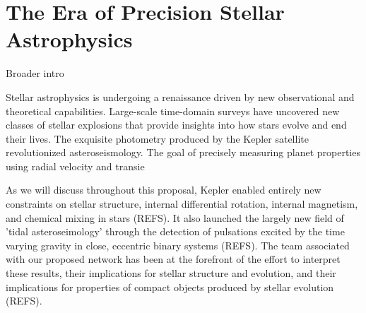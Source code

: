 \section{The Era of Precision Stellar Astrophysics}
Broader intro

Stellar astrophysics is undergoing a renaissance driven by new observational and theoretical capabilities.   Large-scale time-domain surveys have uncovered new classes of stellar explosions that provide insights into how stars evolve and end their lives.  The exquisite photometry produced by the Kepler satellite revolutionized asteroseismology.  The goal of precisely measuring planet properties using radial velocity and transie

As we will discuss throughout this proposal, Kepler enabled entirely new constraints on stellar structure, internal differential rotation, internal magnetism, and chemical mixing in stars (REFS).  It also launched the largely new field of 'tidal asteroseimology' through the detection of pulsations excited by the time varying gravity in close, eccentric binary systems (REFS). The team associated with our proposed network has been at the forefront of the effort to interpret these results, their implications for stellar structure and evolution, and their implications for properties of compact objects produced by stellar evolution (REFS).   

